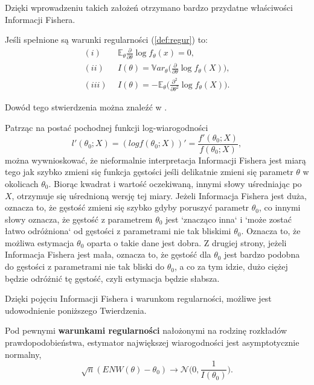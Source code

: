 Dzięki wprowadzeniu takich założeń otrzymano bardzo przydatne właściwości Informacji Fishera.

\begin{proposition}\label{prop:warunki}
Jeśli spełnione są warunki regularności (\ref{def:regur}) to:
\begin{align*}
(i) \ & \ \mathbb{E}_\theta\frac{\partial}{\partial\theta}\log f_{\theta}(x) = 0, \\
(ii) \ & \ I(\theta) = \mathbb{V}ar_{\theta}\Big(\frac{\partial}{\partial\theta}\log f_{\theta}(X) \Big), \\
(iii) \ & \ I(\theta) = -\mathbb{E}_{\theta}\Big(\frac{\partial^2}{\partial\theta^2}\log f_\theta(X) \Big).
\end{align*}
\end{proposition}

Dowód tego stwierdzenia można znaleźć w \cite{niemiro}.

\newpage
Patrząc na postać pochodnej funkcji log-wiarogodności
$$l'(\theta_0;X) = (log f(\theta_0;X))' = \dfrac{f'(\theta_0;X)}{f(\theta_0;X)},$$
można wywnioskować, że nieformalnie interpretacja Informacji Fishera jest miarą tego jak szybko zmieni się funkcja gęstości jeśli delikatnie zmieni się parametr $\theta$ w okolicach $\theta_0$. Biorąc kwadrat i wartość oczekiwaną, innymi słowy uśredniając po $X$, otrzymuje się uśrednioną wersję tej miary. Jeżeli Informacja Fishera jest duża, oznacza to, że gęstość zmieni się szybko gdyby poruszyć parametr $\theta_0$, co innymi słowy oznacza, że gęstość z parametrem $\theta_0$ jest `znacząco inna` i `może zostać łatwo odróżniona` od gęstości z parametrami nie tak bliskimi $\theta_0$. Oznacza to, że możliwa estymacja $\theta_0$ oparta o takie dane jest dobra. Z drugiej strony, jeżeli Informacja Fishera jest mała, oznacza to, że gęstość dla $\theta_0$ jest bardzo podobna do gęstości z parametrami nie tak bliski do $\theta_0$, a co za tym idzie, dużo ciężej będzie odróżnić tę gęstość, czyli estymacja będzie słabsza.

Dzięki pojęciu Informacji Fishera i warunkom regularności, możliwe jest udowodnienie poniższego Twierdzenia.

\begin{theorem}
Pod pewnymi \textbf{warunkami regularności} nałożonymi na rodzinę rozkładów prawdopodobieństwa, estymator największej wiarogodności jest asymptotycznie normalny, 
$$ \sqrt{n}(ENW(\theta) - \theta_0) \rightarrow \mathcal{N}\Big(0, \dfrac{1}{I(\theta_0)}\Big).$$
\end{theorem}

